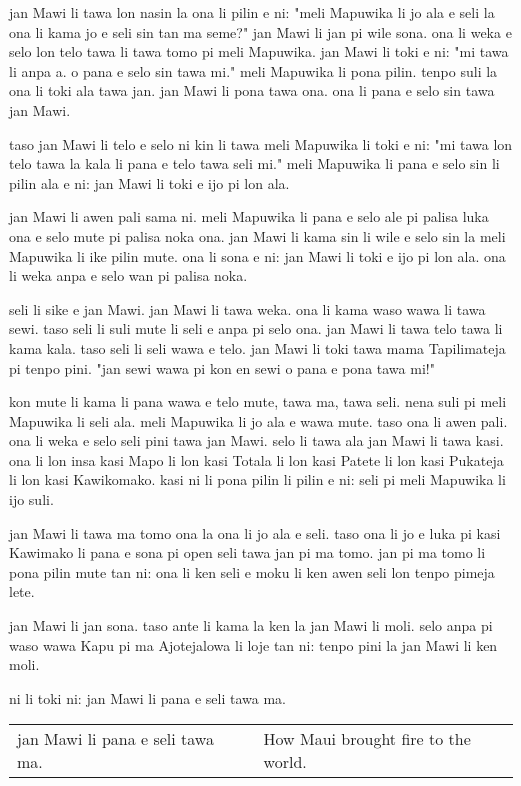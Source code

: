 jan Mawi li tawa lon nasin la ona li pilin e ni:
"meli Mapuwika li jo ala e seli la ona li kama jo e seli sin tan ma seme?"
jan Mawi li jan pi wile sona.
ona li weka e selo lon telo tawa li tawa tomo pi meli Mapuwika.
jan Mawi li toki e ni: "mi tawa li anpa a.
o pana e selo sin tawa mi."
meli Mapuwika li pona pilin.
tenpo suli la ona li toki ala tawa jan.
jan Mawi li pona tawa ona.
ona li pana e selo sin tawa jan Mawi.

taso jan Mawi li telo e selo ni kin li tawa meli Mapuwika li toki e ni:
"mi tawa lon telo tawa la kala li pana e telo tawa seli mi."
meli Mapuwika li pana e selo sin li pilin ala e ni: jan Mawi li toki e ijo pi lon ala.

jan Mawi li awen pali sama ni.
meli Mapuwika li pana e selo ale pi palisa luka ona e selo mute pi palisa noka ona.
jan Mawi li kama sin li wile e selo sin la meli Mapuwika li ike pilin mute.
ona li sona e ni: jan Mawi li toki e ijo pi lon ala.
ona li weka anpa e selo wan pi palisa noka.

seli li sike e jan Mawi.
jan Mawi li tawa weka.
ona li kama waso wawa li tawa sewi.
taso seli li suli mute li seli e anpa pi selo ona.
jan Mawi li tawa telo tawa li kama kala.
taso seli li seli wawa e telo.
jan Mawi li toki tawa mama Tapilimateja pi tenpo pini.
"jan sewi wawa pi kon en sewi o pana e pona tawa mi!"

kon mute li kama li pana wawa e telo mute, tawa ma, tawa seli.
nena suli pi meli Mapuwika li seli ala.
meli Mapuwika li jo ala e wawa mute.
taso ona li awen pali.
ona li weka e selo seli pini tawa jan Mawi.
selo li tawa ala jan Mawi li tawa kasi.
ona li lon insa kasi Mapo li lon kasi Totala li lon kasi Patete li lon kasi Pukateja li lon kasi Kawikomako.
kasi ni li pona pilin li pilin e ni: seli pi meli Mapuwika li ijo suli.

jan Mawi li tawa ma tomo ona la ona li jo ala e seli.
taso ona li jo e luka pi kasi Kawimako li pana e sona pi open seli tawa jan pi ma tomo.
jan pi ma tomo li pona pilin mute tan ni: ona li ken seli e moku li ken awen seli lon tenpo pimeja lete.

jan Mawi li jan sona.
taso ante li kama la ken la jan Mawi li moli.
selo anpa pi waso wawa Kapu pi ma Ajotejalowa li loje tan ni: tenpo pini la jan Mawi li ken moli.

ni li toki ni: jan Mawi li pana e seli tawa ma.

\begin{supertabular}{p{5,5cm}|ll}
    jan Mawi li pana e seli tawa ma. &  & How Maui brought fire to the world. \\
\end{supertabular}

